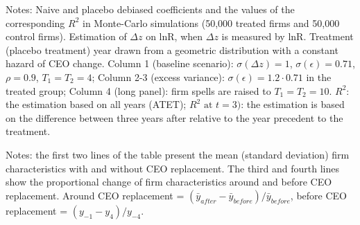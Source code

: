 \documentclass[11pt,a4paper]{article}
\newcommand{\tablepath}{papers/econometrics/table}
\begin{document}
\clearpage

\begin{table}[h]
    \centering
    \caption{Monte Carlo Parameters by Scenario}
    \vspace{.2cm}
    \label{tab:table_MC}
    
    \begin{minipage}{15.5cm}
    \vspace{.2cm}
    \footnotesize{Notes: Naive and placebo debiased coefficients and the values of the corresponding $R^2$ in Monte-Carlo simulations (50,000 treated firms and 50,000 control firms). Estimation of $\Delta z$ on lnR, when $\Delta z$ is measured by lnR. Treatment (placebo treatment) year drawn from a geometric distribution with a constant hazard of CEO change. Column 1 (baseline scenario): $\sigma(\Delta z) = 1$, $\sigma(\epsilon) = 0.71$, $\rho=0.9$, $T_1=T_2=4$; Column 2-3 (excess variance): $\sigma(\epsilon) = 1.2 \cdot 0.71$ in the treated group; Column 4 (long panel): firm spells are raised to $T_1=T_2=10$. $R^2$: the estimation based on all years (ATET); $R^2 \text{ at } t =3)$: the estimation is based on the difference between three years after relative to the year precedent to the treatment.}
    \end{minipage}
\end{table}
\vspace{.5cm}

\begin{table}
    \centering
    \caption{Characteristics of Firms With and Without a CEO Replacement}
    \vspace{.2cm}
    \label{tab:switch_desc}
    
    \begin{minipage}{16cm}
    \vspace{.2cm}
    \footnotesize{Notes: the first two lines of the table present the mean (standard deviation) firm characteristics with and without CEO replacement. The third and fourth lines show the proportional change of firm characteristics around and before CEO replacement. Around CEO replacement = $(\bar y_{after} - \bar y_{before})/\bar y_{before}$}, before CEO replacement = $(y_{-1} - y_{4})/y_{-4}$. 
    \end{minipage}
\end{table}
\vspace{.5cm}
\end{document}
